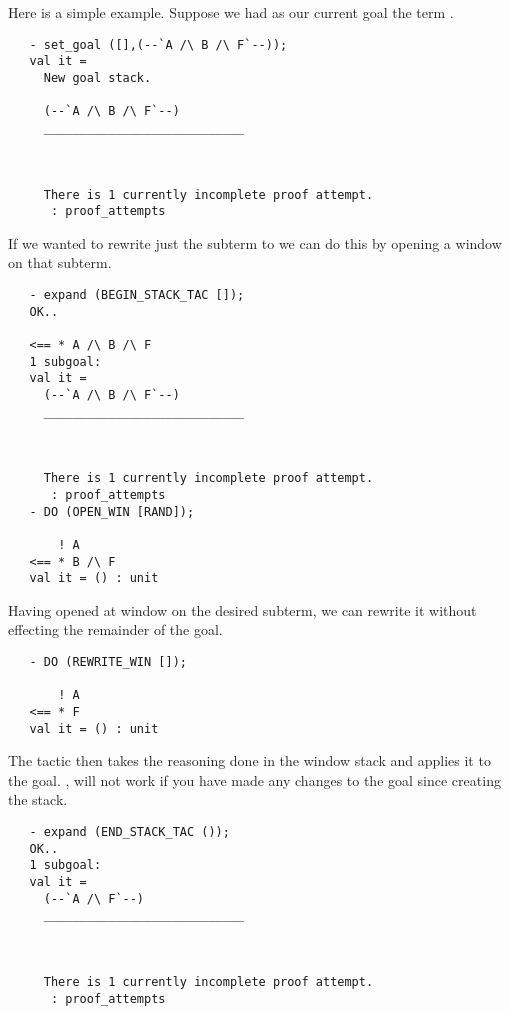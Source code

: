 Here is a simple example.
Suppose we had as our current goal the term .
\setcounter{sessioncount}{1}
\begin{session}\begin{verbatim}
   - set_goal ([],(--`A /\ B /\ F`--));
   val it =
     New goal stack.
     
     (--`A /\ B /\ F`--)
     ____________________________
         
     
     
     There is 1 currently incomplete proof attempt.
      : proof_attempts
\end{verbatim}\end{session}
If we wanted to rewrite just the subterm  to  we
can do this by opening a window on that subterm.
\begin{session}\begin{verbatim}
   - expand (BEGIN_STACK_TAC []);
   OK..
   
   <== * A /\ B /\ F
   1 subgoal:
   val it =
     (--`A /\ B /\ F`--)
     ____________________________
         
     
     
     There is 1 currently incomplete proof attempt.
      : proof_attempts
   - DO (OPEN_WIN [RAND]);
   
       ! A
   <== * B /\ F
   val it = () : unit
\end{verbatim}\end{session}
Having opened at window on the desired subterm, we can rewrite it without
effecting the remainder of the goal.
\begin{session}\begin{verbatim}
   - DO (REWRITE_WIN []);
   
       ! A
   <== * F
   val it = () : unit
\end{verbatim}\end{session}
The  tactic then takes the reasoning done in the 
window stack and applies it to the goal.
, will not work if you have made any changes to the
goal since creating the stack.
\begin{session}\begin{verbatim}
   - expand (END_STACK_TAC ());
   OK..
   1 subgoal:
   val it =
     (--`A /\ F`--)
     ____________________________
         
     
     
     There is 1 currently incomplete proof attempt.
      : proof_attempts
\end{verbatim}\end{session}

